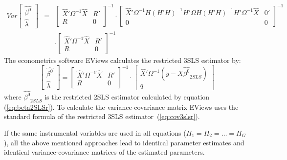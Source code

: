 \begin{eqnarray}
   Var 
   \left[ \begin{array}{c}
      \widehat{\beta^0} \\ \widehat{\lambda}
   \end{array} \right] 
   & = & 
   \left[ \begin{array}{cc}
      \widehat{X}' \Omega^{-1} \widehat{X} & R' \\ 
      R & 0
   \end{array} \right]^{-1}
   \cdot
   \left[ \begin{array}{cc}
      \widehat{X}' \Omega^{-1} H \left( H' H \right)^{-1} H' \Omega
      H \left( H' H \right)^{-1} H' \Omega^{-1} \widehat{X} & 0' \\ 
      0 & 0
   \end{array} \right]^{-1}
   \nonumber \\
   & & \cdot
   \left[ \begin{array}{cc}
      \widehat{X}' \Omega^{-1} \widehat{X} & R' \\ 
      R & 0
   \end{array} \right]^{-1}
\end{eqnarray}
The econometrics software EViews calculates the restricted 3SLS estimator by:
\begin{equation}
   \left[ \begin{array}{c}
      \widehat{\beta^0} \\ \widehat{\lambda}
   \end{array} \right]
   =
   \left[ \begin{array}{cc}
      \widehat{X}' \Omega^{-1} \widehat{X} & R' \\ 
      R & 0
   \end{array} \right]^{-1}
   \cdot
   \left[ \begin{array}{c}
      \widehat{X}' \Omega^{-1} \left( y - X \widehat{\beta^0}_{2SLS} \right) 
      \\ q 
   \end{array} \right]
   \label{eq:3slsEViewsR}
\end{equation}
where $\widehat{\beta^0}_{2SLS}$ is the restricted 2SLS estimator calculated
by equation (\ref{eq:beta2SLSr}). 
To calculate the variance-covariance matrix 
EViews uses the standard formula of the restricted 3SLS
estimator~(\ref{eq:cov3slsr}).


If the same instrumental variables are used in all equations 
($H_1 = H_2 = \ldots = H_G$), 
all the above mentioned approaches lead to identical parameter estimates
and identical variance-covariance matrices of the estimated parameters.

